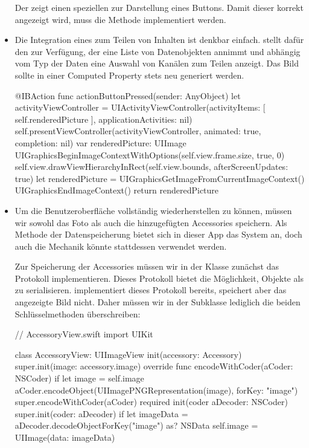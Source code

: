 \documentclass[parskip=half, final]{scrreprt}
\begin{document}
\begin{lecture}
\begin{itemize}
Der  zeigt einen speziellen  zur Darstellung eines  Buttons. Damit dieser korrekt angezeigt wird, muss die  Methode implementiert werden.

\item Die Integration eines  zum Teilen von Inhalten ist denkbar einfach.  stellt dafür den  zur Verfügung, der eine Liste von Datenobjekten annimmt und abhängig vom Typ der Daten eine Auswahl von Kanälen zum Teilen anzeigt. Das Bild sollte in einer Computed Property stets neu generiert werden.

\begin{swiftcode}
    @IBAction func actionButtonPressed(sender: AnyObject) {
        let activityViewController = UIActivityViewController(activityItems: [ self.renderedPicture ], applicationActivities: nil)
        self.presentViewController(activityViewController, animated: true, completion: nil)
    }
    var renderedPicture: UIImage {
        UIGraphicsBeginImageContextWithOptions(self.view.frame.size, true, 0)
        self.view.drawViewHierarchyInRect(self.view.bounds, afterScreenUpdates: true)
        let renderedPicture = UIGraphicsGetImageFromCurrentImageContext()
        UIGraphicsEndImageContext()
        return renderedPicture
    }
\end{swiftcode}

\item Um die Benutzeroberfläche vollständig wiederherstellen zu können, müssen wir sowohl das Foto als auch die hinzugefügten Accessories speichern. Als Methode der Datenspeicherung bietet sich in dieser App das  System an, doch auch die  Mechanik könnte stattdessen verwendet werden.

Zur Speicherung der Accessories müssen wir in der  Klasse zunächst das  Protokoll implementieren. Dieses Protokoll bietet die Möglichkeit, Objekte als  zu serialisieren.  implementiert dieses Protokoll bereits, speichert aber das angezeigte Bild nicht. Daher müssen wir in der Subklasse lediglich die beiden Schlüsselmethoden überschreiben:

\begin{swiftcode}
// AccessoryView.swift
import UIKit

class AccessoryView: UIImageView {
    init(accessory: Accessory) {
        super.init(image: accessory.image)
    }
    override func encodeWithCoder(aCoder: NSCoder) {
        if let image = self.image {
            aCoder.encodeObject(UIImagePNGRepresentation(image), forKey: "image")
        }
        super.encodeWithCoder(aCoder)
    }
    required init(coder aDecoder: NSCoder) {
        super.init(coder: aDecoder)
        if let imageData = aDecoder.decodeObjectForKey("image") as? NSData {
            self.image = UIImage(data: imageData)
        }
    }
}
\end{swiftcode}


\end{itemize}
\end{lecture}
\end{document}
